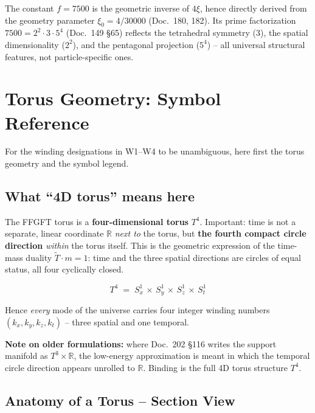 The constant $f = 7500$ is the geometric inverse of $4\xi$, hence
directly derived from the geometry parameter $\xi_0 = 4/30000$
(Doc.~180, 182). Its prime factorization
$7500 = 2^2 \cdot 3 \cdot 5^4$ (Doc.~149 §65) reflects the tetrahedral
symmetry ($3$), the spatial dimensionality ($2^2$), and the pentagonal
projection ($5^4$) -- all universal structural features, not
particle-specific ones.

\section{Torus Geometry: Symbol Reference}

For the winding designations in W1--W4 to be unambiguous, here first
the torus geometry and the symbol legend.

\subsection*{What \enquote{4D torus} means here}

The FFGFT torus is a \textbf{four-dimensional torus} $T^4$.
Important: time is not a separate, linear coordinate $\mathbb{R}$
\emph{next to} the torus, but \textbf{the fourth compact circle
direction} \emph{within} the torus itself. This is the geometric
expression of the time-mass duality $\tilde T \cdot m = 1$: time and
the three spatial directions are circles of equal status, all four
cyclically closed.

\begin{equation}
  T^4 \;=\; S^1_x \,\times\, S^1_y \,\times\, S^1_z \,\times\, S^1_t
  \tag{210.0}
\end{equation}

Hence \emph{every} mode of the universe carries four integer winding
numbers $(k_x, k_y, k_z, k_t)$ -- three spatial and one temporal.

\textbf{Note on older formulations:} where Doc.~202 §116 writes the
support manifold as $T^3 \times \mathbb{R}$, the low-energy
approximation is meant in which the temporal circle direction
appears unrolled to $\mathbb{R}$. Binding is the full 4D torus
structure $T^4$.

\subsection*{Anatomy of a Torus -- Section View}


